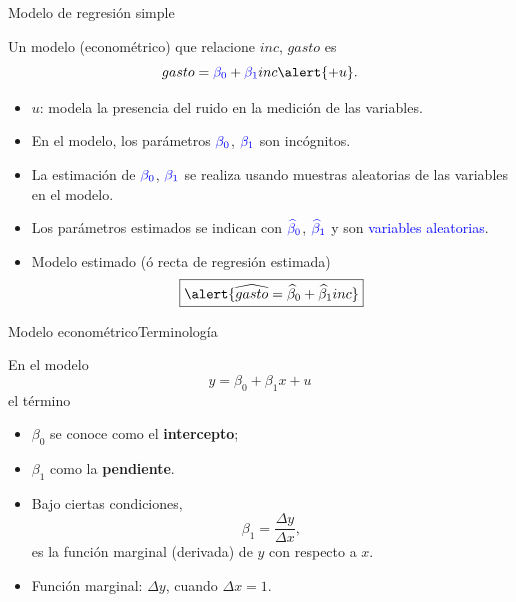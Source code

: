 \documentclass[11pt,handout]{beamer}
\begin{document}
\begin{frame}
{Modelo de regresión simple}

Un modelo (econométrico) que relacione $inc$, $gasto$ es
\[
	gasto = \textcolor{blue}{\beta_0} + \textcolor{blue}{\beta_1} inc \alert{+ u}. %
\]

\begin{itemize}[<+->]
	\item $u$: modela la presencia del ruido en la medición de las variables.
	\item  En el modelo, los parámetros $\textcolor{blue}{\beta_0}$, $\textcolor{blue}{\beta_1}$ son incógnitos.
	\item La \alert{estimación} de $\textcolor{blue}{\beta_0}$, $\textcolor{blue}{\beta_1}$ se realiza usando 
	\alert{muestras aleatorias} de las variables en el modelo.
	\item Los parámetros estimados se indican con $\textcolor{blue}{\widehat{\beta}_0}$, $\textcolor{blue}{\widehat{\beta}_1}$ y son \textcolor{blue}{variables aleatorias}. 
	\item Modelo estimado (ó recta de regresión estimada)
		\[
			\boxed{
				\alert{\widehat{gasto} = \widehat{\beta}_0 + \widehat{\beta}_1 inc}
			}
		\] 

\end{itemize}

\end{frame}

\begin{frame}
{Modelo econométrico}{Terminología}

En el modelo 
\[
	y = \beta_0 + \beta_1 x + u
\]
el término 
\pause 
\begin{itemize}[<+->]
	\item $\beta_0$ se conoce como el \textbf{intercepto};
	\item $\beta_1$ como la \textbf{pendiente}.
	\item Bajo ciertas condiciones, 
		\[ 
			\beta_1 = \frac{\Delta y}{\Delta x}, 
		\]
		es la \alert{función marginal} (derivada) de $y$ con respecto a $x$. 
	\item Función marginal: $\Delta y$, cuando $\Delta x = 1$.
\end{itemize}

\end{frame}
\end{document}
